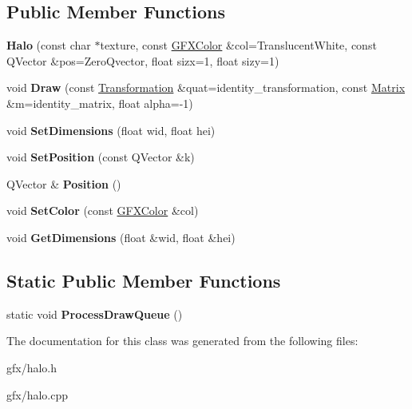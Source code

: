 \subsection*{Public Member Functions}
\begin{DoxyCompactItemize}
\item 
{\bfseries Halo} (const char $\ast$texture, const \hyperlink{structGFXColor}{G\+F\+X\+Color} \&col=Translucent\+White, const Q\+Vector \&pos=Zero\+Qvector, float sizx=1, float sizy=1)\hypertarget{classHalo_a609e844ec39f1541a10097eab8c1137f}{}\label{classHalo_a609e844ec39f1541a10097eab8c1137f}

\item 
void {\bfseries Draw} (const \hyperlink{structTransformation}{Transformation} \&quat=identity\+\_\+transformation, const \hyperlink{classMatrix}{Matrix} \&m=identity\+\_\+matrix, float alpha=-\/1)\hypertarget{classHalo_abc1d824b8250b4f04aa5653da654ee97}{}\label{classHalo_abc1d824b8250b4f04aa5653da654ee97}

\item 
void {\bfseries Set\+Dimensions} (float wid, float hei)\hypertarget{classHalo_a565c67fcaa57ca70907a6e5177e12e65}{}\label{classHalo_a565c67fcaa57ca70907a6e5177e12e65}

\item 
void {\bfseries Set\+Position} (const Q\+Vector \&k)\hypertarget{classHalo_a7999c7daa5cf379970b2f6805fdfb57c}{}\label{classHalo_a7999c7daa5cf379970b2f6805fdfb57c}

\item 
Q\+Vector \& {\bfseries Position} ()\hypertarget{classHalo_ab5577306bedef80f39471b19ed934077}{}\label{classHalo_ab5577306bedef80f39471b19ed934077}

\item 
void {\bfseries Set\+Color} (const \hyperlink{structGFXColor}{G\+F\+X\+Color} \&col)\hypertarget{classHalo_ab85146510da19dc00653aba379cddc0e}{}\label{classHalo_ab85146510da19dc00653aba379cddc0e}

\item 
void {\bfseries Get\+Dimensions} (float \&wid, float \&hei)\hypertarget{classHalo_a2927d5e027f5e1f1c0ea05dc7c690169}{}\label{classHalo_a2927d5e027f5e1f1c0ea05dc7c690169}

\end{DoxyCompactItemize}
\subsection*{Static Public Member Functions}
\begin{DoxyCompactItemize}
\item 
static void {\bfseries Process\+Draw\+Queue} ()\hypertarget{classHalo_a2bbe86637d3ba51e845dc1739cf7a5f7}{}\label{classHalo_a2bbe86637d3ba51e845dc1739cf7a5f7}

\end{DoxyCompactItemize}


The documentation for this class was generated from the following files\+:\begin{DoxyCompactItemize}
\item 
gfx/halo.\+h\item 
gfx/halo.\+cpp\end{DoxyCompactItemize}
